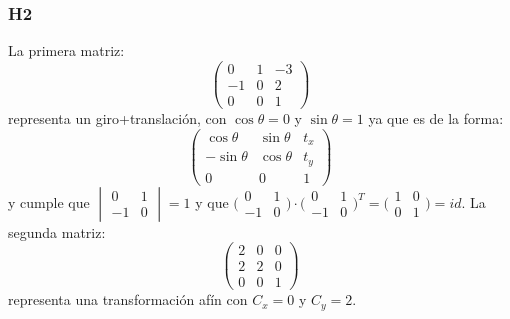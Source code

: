 \subsubsection{H2}
La primera matriz:
\begin{equation}
\begin{pmatrix}
  0 & 1 & -3\\ -1 & 0 & 2\\ 0 & 0 & 1
\end{pmatrix}
\end{equation} representa un giro+translación, con $\cos \theta =0$ y $\sin \theta =1$ ya que es de la forma:
\begin{equation}
\begin{pmatrix}
  \cos \theta & \sin \theta &t_{x} \\ -\sin \theta & \cos \theta &t_{y} \\ 0 & 0 & 1
\end{pmatrix}
\end{equation}
y cumple que  $\begin{vmatrix} 0 &1 \\ -1&0 \end{vmatrix}=1$ y que $\bigl(\begin{smallmatrix} 0 &1 \\ -1 &0 \end{smallmatrix}\bigr)\cdot \bigl(\begin{smallmatrix} 0 &1 \\ -1 &0 \end{smallmatrix}\bigr)^{T}=\bigl(\begin{smallmatrix} 1 &0 \\ 0 &1 \end{smallmatrix}\bigr)=id$.
\newline
La segunda matriz:
\begin{equation}
\begin{pmatrix}
  2 & 0 & 0\\ 2 & 2 & 0\\ 0 & 0 & 1
\end{pmatrix}
\end{equation} representa una transformación afín con $C_{x}=0$ y $C_{y}=2$.

